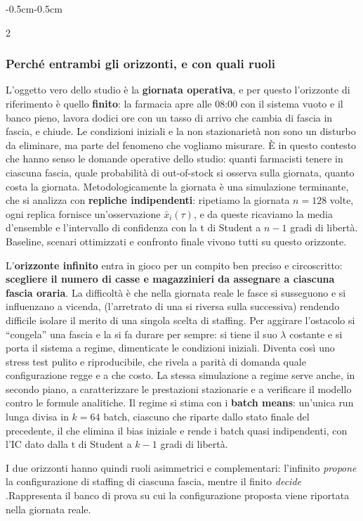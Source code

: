 \documentclass{article}
\begin{document}
\begin{adjustwidth}{-0.5cm}{-0.5cm}
\begin{multicols}{2}
\subsubsection*{Perché entrambi gli orizzonti, e con quali ruoli}
L'oggetto vero dello studio è la \textbf{giornata operativa}, e per questo l'orizzonte di
riferimento è quello \textbf{finito}: la farmacia apre alle 08:00 con il sistema vuoto e il banco
pieno, lavora dodici ore con un tasso di arrivo che cambia di fascia in fascia, e chiude. Le
condizioni iniziali e la non stazionarietà non sono un disturbo da eliminare, ma parte del fenomeno
che vogliamo misurare. È in questo contesto che hanno senso le domande operative
dello studio: quanti farmacisti tenere in ciascuna fascia, quale probabilità di out-of-stock si
osserva sulla giornata, quanto costa la giornata. Metodologicamente la giornata è una simulazione
terminante, che si analizza con \textbf{repliche indipendenti}: ripetiamo la giornata $n = 128$
volte, ogni replica fornisce un'osservazione $\bar{x}_i(\tau)$, e da queste ricaviamo la media
d'ensemble e l'intervallo di confidenza con la t di Student a $n-1$ gradi di libertà. Baseline,
scenari ottimizzati e confronto finale vivono tutti su questo orizzonte.

L'\textbf{orizzonte infinito} entra in gioco per un compito ben preciso e circoscritto:
\textbf{scegliere il numero di casse e magazzinieri da assegnare a ciascuna fascia oraria}. La
difficoltà è che nella giornata reale le fasce si susseguono e si influenzano a vicenda,
(l'arretrato di una si riversa sulla successiva) rendendo difficile isolare il merito di una
singola scelta di staffing. Per aggirare l'ostacolo si ``congela'' una fascia e la si fa durare per
sempre: si tiene il suo $\lambda$ costante e si porta il sistema a regime, dimenticate le condizioni
iniziali. Diventa così uno stress test pulito
e riproducibile, che rivela a parità di domanda quale configurazione regge e a che costo. La stessa
simulazione a regime serve anche, in secondo piano, a caratterizzare le prestazioni stazionarie e a
verificare il modello contro le formule analitiche. Il regime si stima con i
\textbf{batch means}: un'unica run lunga divisa in $k=64$ batch,
ciascuno che riparte dallo stato finale del precedente, il che elimina il bias iniziale e rende
i batch quasi indipendenti, con l'IC dato dalla t di Student a $k-1$ gradi di libertà.

I due orizzonti hanno quindi ruoli asimmetrici e complementari: l'infinito \emph{propone} la
configurazione di staffing di ciascuna fascia, mentre il finito \emph{decide}
.Rappresenta il banco di prova su cui la configurazione proposta viene riportata nella giornata reale.
\end{multicols}
\newpage

\end{adjustwidth}
\end{document}
